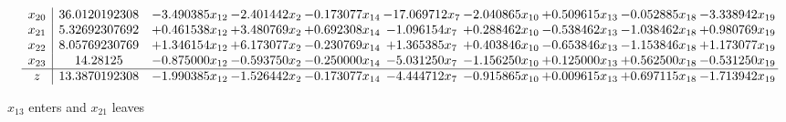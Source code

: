 \documentclass[10pt]{article}
\begin{document}
\[\begin{array}{c| c c@{\hskip 2pt} c@{\hskip 2pt} c@{\hskip 2pt} c@{\hskip 2pt} c@{\hskip 2pt} c@{\hskip 2pt} c@{\hskip 2pt} c@{\hskip 2pt} }
 x_{20}   &  36.0120192308 & -3.490385 x_{12} & -2.401442 x_{2} & -0.173077 x_{14} & -17.069712 x_{7} & -2.040865 x_{10} & + 0.509615 x_{13} & -0.052885 x_{18} & -3.338942 x_{19}\\
 x_{21}   &  5.32692307692 & + 0.461538 x_{12} & + 3.480769 x_{2} & + 0.692308 x_{14} & -1.096154 x_{7} & + 0.288462 x_{10} & -0.538462 x_{13} & -1.038462 x_{18} & + 0.980769 x_{19}\\
 x_{22}   &  8.05769230769 & + 1.346154 x_{12} & + 6.173077 x_{2} & -0.230769 x_{14} & + 1.365385 x_{7} & + 0.403846 x_{10} & -0.653846 x_{13} & -1.153846 x_{18} & + 1.173077 x_{19}\\
 x_{23}   &  14.28125 & -0.875000 x_{12} & -0.593750 x_{2} & -0.250000 x_{14} & -5.031250 x_{7} & -1.156250 x_{10} & + 0.125000 x_{13} & + 0.562500 x_{18} & -0.531250 x_{19}\\
\hline
z    &  13.3870192308 & -1.990385 x_{12} & -1.526442 x_{2} & -0.173077 x_{14} & -4.444712 x_{7} & -0.915865 x_{10} & + 0.009615 x_{13} & + 0.697115 x_{18} & -1.713942 x_{19}\\
\end{array}\]


 $ x_{13} $ enters and $ x_{21} $ leaves 
\end{document}
